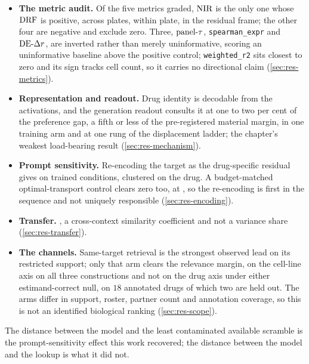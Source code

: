 \begin{itemize}
\item \textbf{The metric audit.} Of the five metrics graded, $\textrm{NIR}$ is the only
one whose $\textrm{DRF}$ is positive,  across plates,
 within plate,  in the
residual frame; the other four are negative and exclude zero. Three,
$\textrm{panel-}\tau$, \texttt{spearman\_expr} and $\textrm{DE-}\Delta r$, are inverted rather than merely
uninformative, scoring an uninformative baseline above the positive control;
\texttt{weighted\_r2} sits closest to zero and its sign tracks cell count, so it
carries no directional claim (\cref{sec:res-metrics}).
\item \textbf{Representation and readout.} Drug identity is decodable from the
activations, and the generation readout consults it at one to two per cent of the
preference gap, a fifth or less of the pre-registered material margin, in one
training arm and at one rung of the displacement ladder; the chapter's weakest
load-bearing result (\cref{sec:res-mechanism}).
\item \textbf{Prompt sensitivity.} Re-encoding the target as the drug-specific
residual gives  on trained conditions, clustered on
the drug. A budget-matched optimal-transport control clears zero too, at
, so the re-encoding is first in the sequence and
not uniquely responsible (\cref{sec:res-encoding}).
\item \textbf{Transfer.} , a cross-context
similarity coefficient and not a variance share (\cref{sec:res-transfer}).
\item \textbf{The channels.} Same-target retrieval is the strongest observed lead
on its restricted support; only that arm clears the relevance margin, on the
cell-line axis on all three constructions and not on the drug axis under either
estimand-correct null, on $18$ annotated drugs of which two are held out. The
arms differ in support, roster, partner count and annotation coverage, so this is
not an identified biological ranking (\cref{sec:res-scope}).
\end{itemize}

\noindent
The distance between the model and the least contaminated available scramble is
the prompt-sensitivity effect this work recovered; the distance between the model
and the lookup is what it did not.
